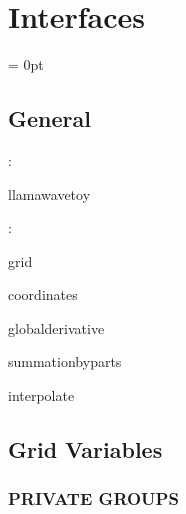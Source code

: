 
\section{Interfaces} 


\parskip = 0pt

\vspace{3mm} \subsection*{General}

: 

llamawavetoy
\vspace{2mm}

: 

grid

coordinates

globalderivative

summationbyparts

interpolate
\vspace{2mm}
\subsection*{Grid Variables}
\vspace{5mm}\subsubsection{PRIVATE GROUPS}

\vspace{5mm}

